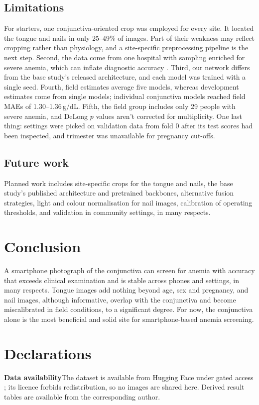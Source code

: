 \documentclass[10pt,a4paper,twocolumn]{article}
\newcommand{\gdl}{\,g/dL}
\begin{document}
\subsection{Limitations}
For starters, one conjunctiva-oriented crop was employed for every site. It located the tongue and nails in only 25--49\% of images. Part of their weakness may reflect cropping rather than physiology, and a site-specific preprocessing pipeline is the next step. Second, the data come from one hospital with sampling enriched for severe anemia, which can inflate diagnostic accuracy \cite{rutjes2006}. Third, our network differs from the base study's released architecture, and each model was trained with a single seed. Fourth, field estimates average five models, whereas development estimates come from single models; individual conjunctiva models reached field MAEs of 1.30--1.36\gdl. Fifth, the field group includes only 29 people with severe anemia, and DeLong $p$ values aren't corrected for multiplicity. One last thing: settings were picked on validation data from fold 0 after its test scores had been inspected, and trimester was unavailable for pregnancy cut-offs.

\subsection{Future work}
Planned work includes site-specific crops for the tongue and nails, the base study's published architecture and pretrained backbones, alternative fusion strategies, light and colour normalisation for nail images, calibration of operating thresholds, and validation in community settings, in many respects.

\section{Conclusion}
A smartphone photograph of the conjunctiva can screen for anemia with accuracy that exceeds clinical examination and is stable across phones and settings, in many respects. Tongue images add nothing beyond age, sex and pregnancy, and nail images, although informative, overlap with the conjunctiva and become miscalibrated in field conditions, to a significant degree. For now, the conjunctiva alone is the most beneficial and solid site for smartphone-based anemia screening.

\section*{Declarations}
\small
\noindent\textbf{Data availability}\enspace The dataset is available from Hugging Face under gated access \cite{sewa2026}; its licence forbids redistribution, so no images are shared here. Derived result tables are available from the corresponding author.
\end{document}
